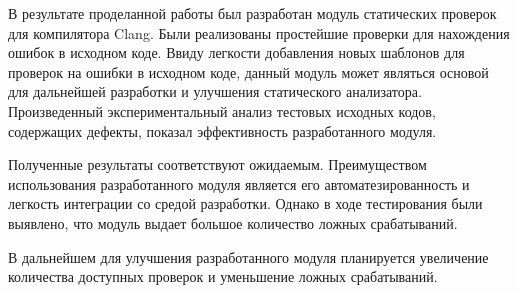 \conclusion
В результате проделанной работы был разработан модуль статических проверок для компилятора Clang.
Были реализованы простейшие проверки для нахождения ошибок в исходном коде. Ввиду легкости добавления новых 
шаблонов для проверок на ошибки в исходном коде, данный модуль может являться основой для дальнейшей 
разработки и улучшения статического анализатора. 
Произведенный экспериментальный анализ тестовых исходных кодов, содержащих дефекты, показал
эффективность разработанного модуля. 

Полученные результаты соответствуют ожидаемым. Преимуществом использования разработанного модуля
является его автоматезированность и легкость интеграции со средой разработки. Однако в ходе тестирования были
выявлено, что модуль выдает большое количество ложных срабатываний.

В дальнейшем для улучшения разработанного модуля планируется увеличение количества доступных проверок и 
уменьшение ложных срабатываний.
